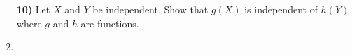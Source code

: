 \documentclass[left={All of Statistics},right={Chapter 02}]{exercises}
\begin{document}
\begin{enumerate}
    \item[\textbf{10)}] Let $X$ and $Y$ be independent. Show that $g(X)$ is independent of $h(Y)$ where $g$ and $h$ are functions.
    
    \item 
\end{enumerate}
\end{document}
